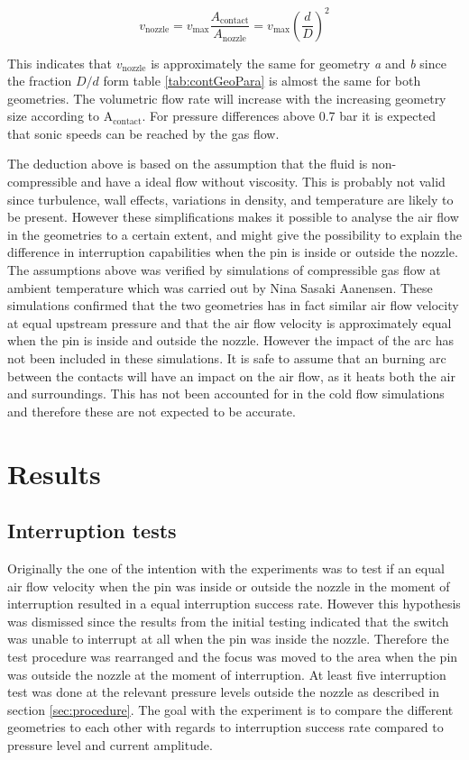 \documentclass[10pt,a4paper,twoside]{article}
\begin{document}
\begin{equation} \label{eq:VolumetricFlow}
v_\mathrm{{nozzle}}= v_\mathrm{{max}}\frac{A_\mathrm{{contact}}}{A_\mathrm{{nozzle}} }= v_\mathrm{{max}} \left(\frac{d}{D}\right)^2
\end{equation} 

This indicates that $v_\mathrm{{nozzle}}$ is approximately the same for geometry \textit{a} and \textit{b} since the fraction $D/d$ form table \ref{tab:contGeoPara} is almost the same for both geometries. The volumetric flow rate will increase with the increasing geometry size according to A$_\mathrm{{contact}}$. For pressure differences above 0.7 bar it is expected that sonic speeds can be reached by the gas flow.

The deduction above is based on the assumption that the fluid is non-compressible and have a ideal flow without viscosity. This is probably not valid since turbulence, wall effects, variations in density, and temperature are likely to be present. However these simplifications makes it possible to analyse the air flow in the geometries to a certain extent, and might give the possibility to explain the difference in interruption capabilities when the pin is inside or outside the nozzle. The assumptions above was verified by simulations of compressible gas flow at ambient temperature which was carried out by Nina Sasaki Aanensen. These simulations confirmed that the two geometries has in fact similar air flow velocity at equal upstream pressure and that the air flow velocity is approximately equal when the pin is inside and outside the nozzle. However the impact of the arc has not been included in these simulations. It is safe to assume that an burning arc between the contacts will have an impact on the air flow, as it heats both the air and surroundings. This has not been accounted for in the cold flow simulations and therefore these are not expected to be accurate.

\cleardoublepage

\section{Results}
\subsection{Interruption tests} \label{sec:interChance}
Originally the one of the intention with the experiments was to test if an equal air flow velocity when the pin was inside or outside the nozzle in the moment of interruption resulted in a equal interruption success rate. However this hypothesis was dismissed since the results from the initial testing indicated that the switch was unable to interrupt at all when the pin was inside the nozzle. Therefore the test procedure was rearranged and the focus was moved to the area when the pin was outside the nozzle at the moment of interruption. At least five interruption test was done at the relevant pressure levels outside the nozzle as described in section \ref{sec:procedure}. The goal with the experiment is to compare the different geometries to each other with regards to interruption success rate compared to pressure level and current amplitude.
\end{document}
